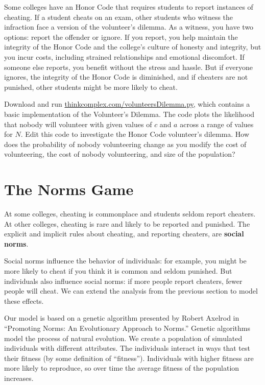 \documentclass[10pt]{book}
\begin{document}
\begin{exercise}

Some colleges have an Honor Code that requires students to report
instances of cheating.  If a student cheats on an exam, other students
who witness the infraction face a version of the volunteer's
dilemma. As a witness, you have two options: report the offender or
ignore. If you report, you help maintain the integrity of the Honor
Code and the college's culture of honesty and integrity, but you incur
costs, including strained relationships and emotional discomfort.  If
someone else reports, you benefit without the stress and hassle.  But
if everyone ignores, the integrity of the Honor Code is diminished, and
if cheaters are not punished, other students might be more likely to
cheat.

Download and run \url{thinkcomplex.com/volunteersDilemma.py}, which
contains a basic implementation of the Volunteer's Dilemma. The code
plots the likelihood that nobody will volunteer with given values of
$c$ and $a$ across a range of values for $N$.  Edit this code to
investigate the Honor Code volunteer's dilemma.  How does the
probability of nobody volunteering change as you modify the cost of
volunteering, the cost of nobody volunteering, and size of the
population?
\end{exercise}


\section{The Norms Game}

At some colleges, cheating is commonplace and students seldom report
cheaters.  At other colleges, cheating is rare and likely
to be reported and punished.  The explicit and implicit rules about
cheating, and reporting cheaters, are {\bf social norms}.

Social norms influence the behavior of individuals: for example, you
might be more likely to cheat if you think it is common and seldom
punished.  But individuals also influence social norms: if more
people report cheaters, fewer people will cheat.
We can extend the analysis from the previous section to model these
effects.

Our model is based on a genetic algorithm presented by Robert Axelrod
in ``Promoting Norms: An Evolutionary Approach to Norms.''  Genetic
algorithms model the process of natural evolution.  We create a
population of simulated individuals with different attributes.  The
individuals interact in ways that test their fitness (by some
definition of ``fitness'').  Individuals with higher fitness are more
likely to reproduce, so over time the average fitness of the
population increases.
\end{document}
